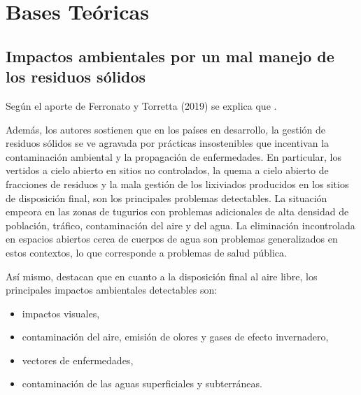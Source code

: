 \section{Bases Teóricas}

\subsection{Impactos ambientales por un mal manejo de los residuos sólidos}

Según el aporte de Ferronato y Torretta (2019) se explica que .

Además, los autores sostienen que en los países en desarrollo, la gestión de residuos sólidos se ve agravada por prácticas insostenibles que incentivan la contaminación ambiental y la propagación de enfermedades. En particular, los vertidos a cielo abierto en sitios no controlados, la quema a cielo abierto de fracciones de residuos y la mala gestión de los lixiviados producidos en los sitios de disposición final, son los principales problemas detectables. La situación empeora en las zonas de tugurios con problemas adicionales de alta densidad de población, tráfico, contaminación del aire y del agua. La eliminación incontrolada en espacios abiertos cerca de cuerpos de agua son problemas generalizados en estos contextos, lo que corresponde a problemas de salud pública. 

Así mismo, destacan que en cuanto a la disposición final al aire libre, los principales impactos ambientales detectables son:

\begin{itemize}
    \item impactos visuales,
    
    \item contaminación del aire, emisión de olores y gases de efecto invernadero,
    
    \item vectores de enfermedades,
    
    \item contaminación de las aguas superficiales y subterráneas.
\end{itemize}

